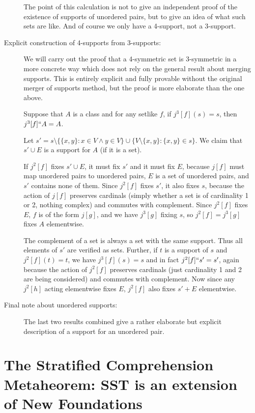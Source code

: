 \documentclass[12pt]{article}
\begin{document}
\begin{description}
The point of this calculation is not to give an independent proof of the existence of supports of unordered pairs, but to give an idea of what such sets are like.  And of course we only have a 4-support, not a 3-support.

\item[Explicit construction of 4-supports from 3-supports:]  We will carry out the proof that a 4-symmetric set is 3-symmetric in a more concrete way which does not rely on
the general result about merging supports.  This is entirely explicit and fully provable without the original merger of supports method, but the proof is more elaborate than the one above.


Suppose that $A$ is a class and for any setlike $f$, if $j^3[f](s)=s$, then $j^3[f]``A = A$.

Let $s' = s \setminus \{\{x,y\}:x \in V \wedge y \in V\} \cup \{V \setminus \{x,y\}:\{x,y\}\in s\}$.  We claim that $s' \cup E$ is a support for $A$ (if it is a set).

If $j^2[f]$ fixes $s' \cup E$, it must fix $s'$ and it must fix $E$, because $j[f]$ must map unordered pairs to unordered pairs, $E$ is a set of unordered pairs, and $s'$ contains none of them.
Since $j^2[f]$ fixes $s'$, it also fixes $s$, because the action of $j[f]$ preserves cardinals (simply whether a set is of cardinality 1 or 2, nothing complex) and commutes with complement.  Since $j^2[f]$ fixes $E$, $f$ is of the form $j[g]$,
and we have $j^3[g]$ fixing $s$, so $j^2[f] = j^3[g]$ fixes $A$ elementwise.

The complement of a set is always a set with the same support.  Thus all elements of $s'$ are verified as sets.  Further, if $t$ is a support of $s$ and $j^2[f](t)=t$, we have $j^3[f](s)=s$ and in fact $j^2[f]``s'=s'$, again because the action of $j^2[f]$ preserves cardinals (just cardinality 1 and 2 are being considered) and commutes with complement.
Now since any $j^2[h]$ acting elementwise fixes $E$, $j^2[f]$ also fixes $s'+E$ elementwise.

\item[Final note about unordered supports:]  The last two results combined give a rather elaborate but explicit description of a support for an unordered pair.





\end{description}

\section{The Stratified Comprehension Metaheorem:  SST is an extension of New Foundations}
\end{document}
